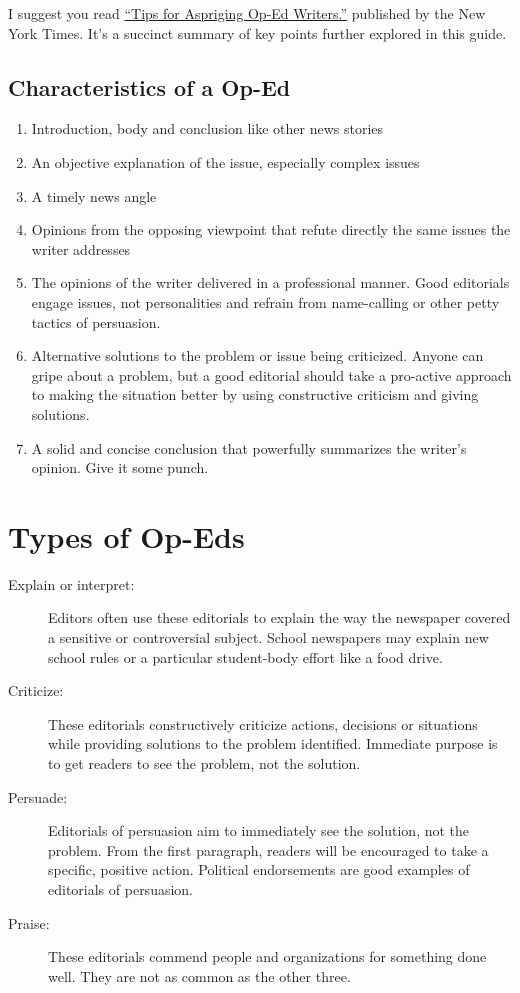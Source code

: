 \documentclass{tufte-handout}\usepackage[]{graphicx}\usepackage[]{color}
\begin{document}
I suggest you read \href{https://www.nytimes.com/2017/08/25/opinion/tips-for-aspiring-op-ed-writers.html?smprod=nytcore-ipad&smid=nytcore-ipad-share}{``Tips for Aspriging Op-Ed Writers.''} published by the New York Times. It's a succinct summary of key points further explored in this guide.

\subsection{Characteristics of a Op-Ed}

\begin{enumerate}
	\item Introduction, body and conclusion like other news stories
	\item An objective explanation of the issue, especially complex issues
	\item A timely news angle
	\item Opinions from the opposing viewpoint that refute directly the same issues the writer addresses
	\item The opinions of the writer delivered in a professional manner. Good editorials engage issues, not personalities and refrain from name-calling or other petty tactics of persuasion.
	\item Alternative solutions to the problem or issue being criticized. Anyone can gripe about a problem, but a good editorial should take a pro-active approach to making the situation better by using constructive criticism and giving solutions.
	\item A solid and concise conclusion that powerfully summarizes the writer's opinion. Give it some punch.
\end{enumerate}

\section{Types of Op-Eds}

\begin{description}
	\item[Explain or interpret:] Editors often use these editorials to explain the way the newspaper covered a sensitive or controversial subject. School newspapers may explain new school rules or a particular student-body effort like a food drive.
	\item[Criticize:] These editorials constructively criticize actions, decisions or situations while providing solutions to the problem identified. Immediate purpose is to get readers to see the problem, not the solution.
	\item[Persuade:] Editorials of persuasion aim to immediately see the solution, not the problem. From the first paragraph, readers will be encouraged to take a specific, positive action. Political endorsements are good examples of editorials of persuasion.
	\item[Praise:] These editorials commend people and organizations for something done well. They are not as common as the other three.
\end{description}
 
\end{document}
